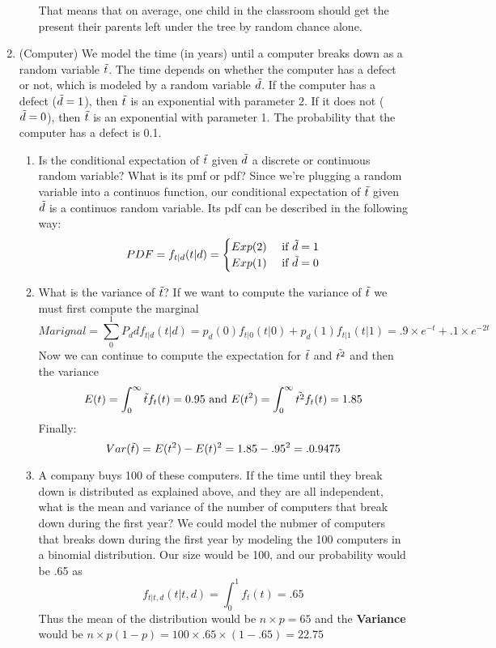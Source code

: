 \documentclass[12pt,twoside]{article}
\newcommand{\rnd}{\Tilde}
\begin{document}
\begin{enumerate}
\begin{enumerate}
That means that on average, one child in the classroom should get the present their parents left under the tree by random chance alone. 

\end{enumerate}


\item (Computer) We model the time (in years) until a computer breaks down as a random variable $\rnd{t}$. The time depends on whether the computer has a defect or not, which is modeled by a random variable $\rnd{d}$. If the computer has a defect ($\rnd{d}=1$), then $\rnd{t}$ is an exponential with parameter 2. If it does not ($\rnd{d}=0$), then $\rnd{t}$ is an exponential with parameter 1. The probability that the computer has a defect is 0.1.
\begin{enumerate}
\item Is the conditional expectation of $\rnd{t}$ given $\rnd{d}$ a discrete or continuous random variable? What is its pmf or pdf? 
\subitem 
Since we're plugging a random variable into a continuos function, our conditional expectation of  $\rnd{t}$ given $\rnd{d}$ is a continuos random variable. Its pdf can be described in the following way:
$$
PDF = f_{t|d}(t|d) = 
    \begin{cases}
    Exp(2) & \text{ if } \rnd{d}=1 \\
    Exp(1) & \text{ if } \rnd{d}=0
    \end{cases}
$$
\item What is the variance of $\rnd{t}$?
\subitem
If we want to compute the variance of $\rnd{t}$ we must first compute the marginal
$$
    Marignal = \sum_0^1 P_d{d}f_{t|d}(t|d) = p_d(0)f_{t|0}(t|0) + p_d(1)f_{t|1}(t|1) = .9 \times e^{-t} + .1\times e^{-2t}
$$
Now we can continue to compute the expectation for $\rnd{t}$ and $\rnd{t^2}$ and then the variance
$$
    E(t) = \int_0^\infty \rnd{t}f_t(t) = 0.95 \text{ and } E(t^2) = \int_0^\infty \rnd{t^2}f_t(t) = 1.85
$$
Finally:
$$
    Var(\rnd{t}) = E(t^2)-E(t)^2 = 1.85 - .95^2 = .0.9475
$$
\item A company buys 100 of these computers. If the time until they break down is distributed as explained above, and they are all independent, what is the mean and variance of the number of computers that break down during the first year?
\subitem 
We could model the nubmer of computers that breaks down during the first year by modeling the 100 computers in a binomial distribution. Our size would be 100, and our probability would be .65 as
$$
    f_{t|t,d}(t|t,d) = \int_0^1 f_{t}(t) = .65
$$
Thus the mean of the distribution would be $n\times p = 65$ and the \textbf{Variance} would be $n\times p(1-p) = 100 \times .65 \times (1-.65) = 22.75 $
\end{enumerate}


\end{enumerate}
\end{document}
